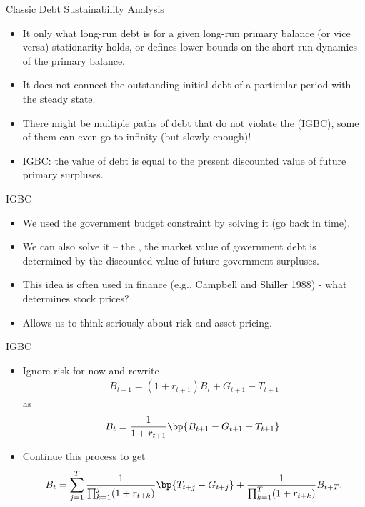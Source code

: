 \documentclass[11pt,xcolor={dvipsnames},aspectratio=159,hyperref={pdftex,pdfpagemode=UseNone,hidelinks,pdfdisplaydoctitle=true},usepdftitle=false]{beamer}
\begin{document}
\begin{frame}{Classic Debt Sustainability Analysis}
    \begin{itemize}
        \item It only  what long-run debt
        is for a given long-run primary balance (or vice versa)  stationarity holds, or defines lower bounds on the
        short-run dynamics of the primary balance.
        \item It does not connect the outstanding initial debt of a
        particular period with the steady state.
        \item There might be multiple paths of debt that do not violate the  (IGBC), some of them can even go to infinity (but slowly enough)!
        \item IGBC: the value of debt is equal to the present discounted value of future primary surpluses.
    \end{itemize}
\end{frame}

\begin{frame}
\end{frame}

\begin{frame}{IGBC}
    \begin{itemize}
        \item We used the government budget constraint by solving it  (go back in time).
        \item We can also solve it  -- the , the market value of government debt is determined by the discounted value of future government surpluses. 
        \item This idea is often used in finance (e.g., Campbell and Shiller 1988) - what determines stock prices?
        \item Allows us to think seriously about risk and asset pricing.
    \end{itemize}
\end{frame}

\begin{frame}{IGBC}
    \begin{itemize}
        \item Ignore risk for now and rewrite \begin{align*}             
            B_{t+1} = (1+r_{t+1})B_{t} + G_{t+1} - T_{t+1} \end{align*}
            as 
            \begin{align*}
                B_t =  \frac{1}{1+r_{t+1}}\bp{B_{t+1} - G_{t+1} + T_{t+1}}.
            \end{align*}
            \item Continue this process to get 
            \begin{align*}
                B_t = \sum_{j=1}^T \frac{1}{\prod_{k=1}^j (1+r_{t+k})} \bp{T_{t+j}-G_{t+j}} +\frac{1}{\prod_{k=1}^T (1+r_{t+k})}  B_{t+T}.
            \end{align*}
    \end{itemize}
\end{frame}
\end{document}
